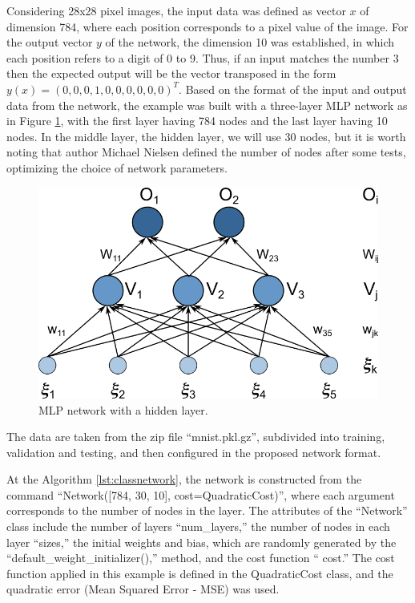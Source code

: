 Considering 28x28 pixel images, the input data was defined as vector $x$ of dimension 784, where each position corresponds to a pixel value of the image. For the output vector $y$ of the network, the dimension 10 was established, in which each position refers to a digit of 0 to 9. Thus, if an input matches the number 3 then the expected output will be the vector transposed in the form $y(x)=(0,0,0,1,0,0,0,0,0,0)^T$. Based on the format of the input and output data from the network, the example was built with a three-layer MLP network as in Figure \ref{fig:figure111}, with the first layer having 784 nodes and the last layer having 10 nodes. In the middle layer, the hidden layer, we will use 30 nodes, but it is worth noting that author Michael Nielsen defined the number of nodes after some tests, optimizing the choice of network parameters.

\begin{figure}
    \centering
    \includegraphics[scale=0.55]{"Part 3 - Learning Systems/Supervised Learning/Deep Learning/images/figure111.png"}
    \caption{MLP network with a hidden layer.}
    \label{fig:figure111}
\end{figure}

The data are taken from the zip file “mnist.pkl.gz”, subdivided into training, validation and testing, and then configured in the proposed network format.

At the Algorithm \ref{lst:classnetwork}, the network is constructed from the command “Network([784, 30, 10], cost=QuadraticCost)”, where each argument corresponds to the number of nodes in the layer. The attributes of the “Network” class include the number of layers “num\_layers,” the number of nodes in each layer “sizes,” the initial weights and bias, which are randomly generated by the “default\_weight\_initializer(),” method, and the cost function “ cost.” The cost function applied in this example is defined in the QuadraticCost class, and the quadratic error (Mean Squared Error - MSE) was used.

